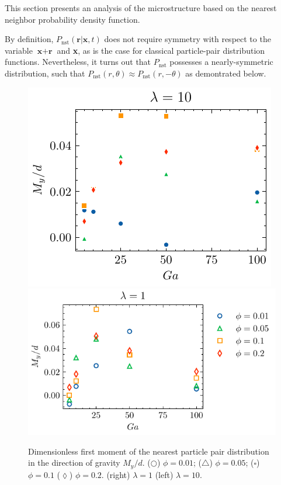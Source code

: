 This section presents an analysis of the microstructure based on the nearest neighbor probability density function. 


By definition, $P_\text{nst}(\textbf{r}|\textbf{x},t)$ does not require symmetry with respect to the variable $\textbf{x}+\textbf{r}$ and \textbf{x}, as is the case for classical particle-pair distribution functions. 
Nevertheless, it turns out that $P_\text{nst}$ possesses a nearly-symmetric distribution, such that  $P_\text{nst}(r,\theta)\approx P_\text{nst}(r,- \theta)$ as demontrated below.
\begin{figure}[h!]
    \centering
    \includegraphics[height = 0.3\textwidth]{image/HOMOGENEOUS_NEW/PA/Ry_l_10.pdf}
    \includegraphics[height = 0.3\textwidth]{image/HOMOGENEOUS_NEW/PA/Ry_l_1.pdf}
    \caption{ Dimensionless first moment of the nearest particle pair distribution in the direction of gravity $M_y/d$. 
    ($\pmb\bigcirc$) $\phi = 0.01$; ($\pmb\triangle$) $ \phi = 0.05$; ($\pmb\square$) $\phi = 0.1$ ($\pmb\lozenge$) $\phi = 0.2$.
    (right)  $\lambda  = 1$
    (left)  $\lambda  = 10$.
    }
    \label{fig:ap:RY}
\end{figure}
